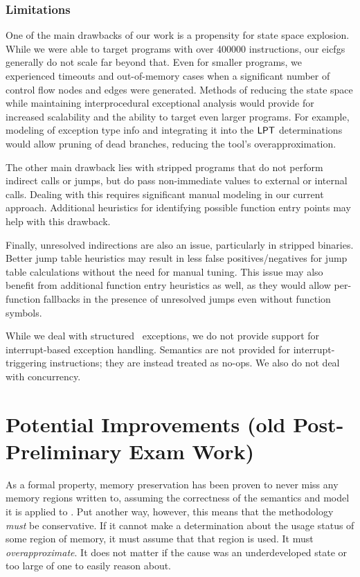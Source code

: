 \subsubsection{Limitations}
One of the main drawbacks of our work is a propensity for state space explosion.
While we were able to target programs with over \num{400000} instructions,
our \acp{eicfg} generally do not scale far beyond that. Even for smaller programs, we experienced timeouts and out-of-memory cases when a significant number of control flow nodes and edges were generated.
Methods of reducing the state space while maintaining interprocedural exceptional analysis would provide for increased scalability and the ability to target even larger programs.
For example, modeling of exception type info and integrating it into the $\operatorname{\mathsf{LPT}}$ determinations would allow pruning of dead branches, reducing the tool's overapproximation.

The other main drawback lies with stripped programs that do not perform indirect calls or jumps, but do pass non-immediate values to external or internal calls.
Dealing with this requires significant manual modeling in our current approach.
Additional heuristics for identifying possible function entry points \autocite{bao2014byteweight,pe2020probabilistic}
may help with this drawback.

Finally, unresolved indirections are also an issue, particularly in stripped binaries.
Better jump table heuristics \autocite{cifuentes2001recovery,flexeder2010reconstruction,gedich2015switch,an2022dsv}
may result in less false positives/negatives for jump table calculations without the need for manual tuning.
This issue may also benefit from additional function entry heuristics as well,
as they would allow per-function fallbacks in the presence of unresolved jumps even without function symbols.

While we deal with structured \Cpp\ exceptions, we do not provide support for interrupt-based exception handling.
Semantics are not provided for interrupt-triggering instructions; they are instead treated as no-ops.
We also do not deal with concurrency.

\section{Potential Improvements (old Post-Preliminary Exam Work)}
As a formal property, memory preservation
has been proven to never miss any memory regions written to,
assuming the correctness of the semantics and model it is applied
to \autocite{bockenek2019preservation,popl2019underreview}.
Put another way, however, this means that the methodology \emph{must} be conservative.
If it cannot make a determination about the usage status of some region of memory,
it must assume that that region is used. It must \emph{overapproximate}.%
It does not matter if the cause was an underdeveloped state
or too large of one to easily reason about.

